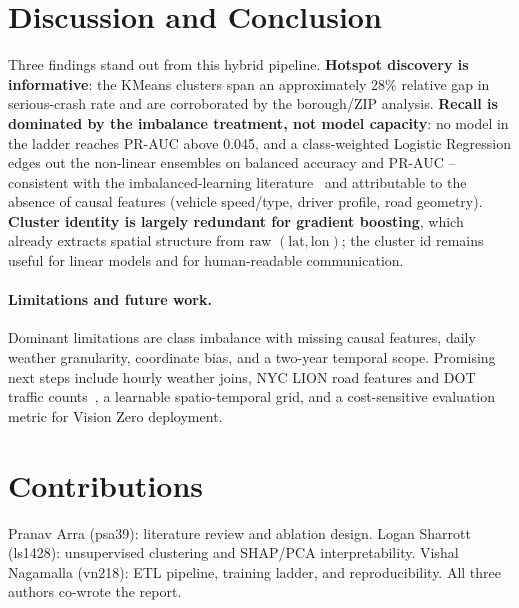 \documentclass{article}
\begin{document}
\FloatBarrier
\section{Discussion and Conclusion}
\label{sec:discussion}

Three findings stand out from this hybrid pipeline.
\textbf{Hotspot discovery is informative}: the KMeans clusters span an
approximately 28\% relative gap in \mbox{serious-crash} rate and are
corroborated by the borough/ZIP analysis. \textbf{Recall is dominated by the
imbalance treatment, not model capacity}: no model in the ladder reaches
PR-AUC above 0.045, and a class-weighted Logistic Regression edges out the
non-linear ensembles on balanced accuracy and PR-AUC -- consistent with the
imbalanced-learning literature~\cite{he2009imbalanced} and attributable to
the absence of causal features (vehicle speed/type, driver profile, road
geometry). \textbf{Cluster identity is largely redundant for gradient
boosting}, which already extracts spatial structure from raw
$(\mathrm{lat},\mathrm{lon})$; the cluster id remains useful for linear
models and for human-readable communication.

\paragraph{Limitations and future work.}
Dominant limitations are class imbalance with missing causal features, daily
weather granularity, coordinate bias, and a two-year temporal scope.
Promising next steps include hourly weather joins, NYC LION road features
and DOT traffic counts~\cite{theofilatos2014review}, a learnable
spatio-temporal grid, and a cost-sensitive evaluation metric for Vision Zero
deployment.

\section*{Contributions}
Pranav Arra (psa39): literature review and ablation design. Logan Sharrott
(ls1428): unsupervised clustering and SHAP/PCA interpretability. Vishal
Nagamalla (vn218): ETL pipeline, training ladder, and reproducibility. All
three authors co-wrote the report.



\end{document}
